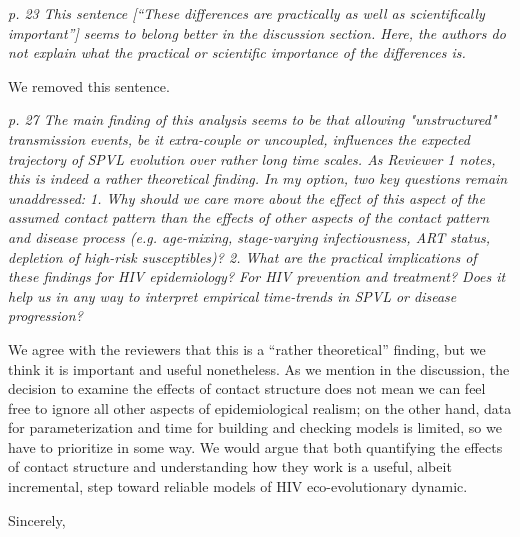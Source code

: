 \documentclass[10pt]{letter}
\newcommand{\revcomment}[1]{\emph{#1}}
\newcommand{\response}[1]{#1}
\begin{document}
\begin{letter}{
}
\revcomment{
p. 23 
This sentence [``These differences are practically as well as
scientifically important''] seems to belong better in the discussion section. Here, the authors do not explain what the practical or scientific importance of the differences is.
}

\response{
We removed this sentence.
}

\revcomment{
p. 27 The main finding of this analysis seems to be that allowing "unstructured" transmission events, be it extra-couple or uncoupled, influences the expected trajectory of SPVL evolution over rather long time scales. As Reviewer 1 notes, this is indeed a rather theoretical finding. In my option, two key questions remain unaddressed: 1. Why should we care more about the effect of this aspect of the assumed contact pattern than the effects of other aspects of the contact pattern and disease process (e.g. age-mixing, stage-varying infectiousness, ART status, depletion of high-risk susceptibles)?
2. What are the practical implications of these findings for HIV
epidemiology? For HIV prevention and treatment? Does it help us in any
way to interpret empirical time-trends in SPVL or disease progression?
}

\response{
We agree with the reviewers that this is a ``rather theoretical'' finding,
but we think it is important and useful nonetheless.  As we mention
in the discussion, the decision to examine the effects of contact
structure does not mean we can feel free to ignore all other aspects
of epidemiological realism; on the other hand, data for
parameterization and time for building and checking models is
limited, so we have to prioritize in some way. We would argue that
both quantifying the effects of contact structure and understanding
how they work is a useful, albeit incremental, step toward reliable
models of HIV eco-evolutionary dynamic.
}

\closing{Sincerely,}



\end{letter}
\end{document}
